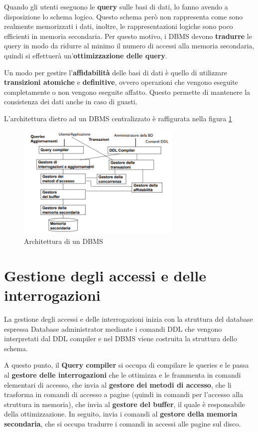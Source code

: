 Quando gli utenti eseguono le \textbf{query} sulle basi di dati, lo fanno avendo
a disposizione lo schema logico. Questo schema però non rappresenta come sono
realmente memorizzati i dati, inoltre, le rappresentazioni logiche sono poco
efficienti in memoria secondaria. Per questo motivo, i DBMS devono
\textbf{tradurre} le query in modo da ridurre al minimo il numero di accessi
alla memoria secondaria, quindi si effettuerà un'\textbf{ottimizzazione delle query}.

Un modo per gestire l'\textbf{affidabilità} delle basi di dati è quello di utilizzare
\textbf{transizioni atomiche} e \textbf{definitive}, ovvero operazioni che
vengono eseguite completamente o non vengono eseguite affatto. Questo permette
di mantenere la consistenza dei dati anche in caso di guasti.

L'architettura dietro ad un DBMS centralizzato è raffigurata nella figura \ref{fig:DBMS_architecture}
\begin{figure}[!ht]
      \centering
      \includegraphics[width=0.7\textwidth]{./img/DBMS/Architettura.png}
      \caption{Architettura di un DBMS}
      \label{fig:DBMS_architecture}
\end{figure}
\section{Gestione degli accessi e delle interrogazioni}
La gestione degli accessi e delle interrogazioni inizia con la struttura del database
espressa Database administrator mediante i comandi DDL che vengono interpretati
dal DDL compiler e nel DBMS viene costruita la struttura dello schema.

A questo punto, il \textbf{Query compiler} si occupa di compilare le queries e le
passa al \textbf{gestore delle interrogazioni} che le ottimizza e le frammenta in
comandi elementari di accesso, che invia al \textbf{gestore dei metodi di accesso},
che li trasforma in comandi di accesso a pagine (quindi in comandi per l'accesso
alla struttura in memoria), che invia al \textbf{gestore del buffer}, il quale è
responsabile della ottimizzazione. In seguito, invia i comandi al \textbf{gestore
      della memoria secondaria}, che si occupa tradurre i comandi in accessi alle
pagine sul disco.
